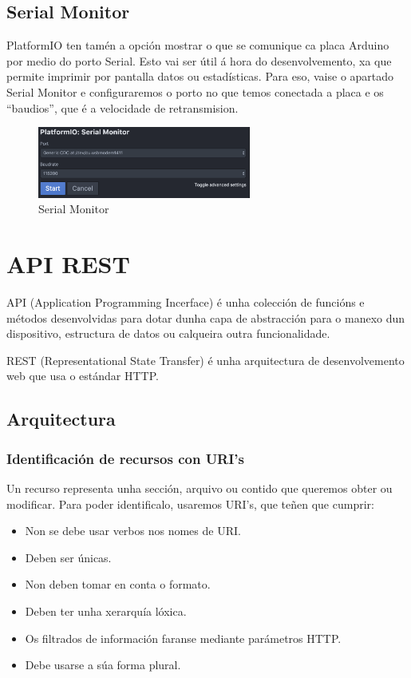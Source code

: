 \documentclass[11pt,twoside]{book}
\begin{document}
\subsection{Serial Monitor}

PlatformIO ten tamén a opción mostrar o que se comunique ca placa Arduino por medio do porto Serial.
Esto vai ser útil á hora do desenvolvemento, xa que permite imprimir por pantalla datos ou estadísticas.
 Para eso, vaise o apartado Serial Monitor e configuraremos o porto no que temos conectada a placa e os ``baudios'', que é a velocidade de retransmision.
 
 \begin{figure}[H]
	\begin{center}
		\includegraphics[width=7cm]{images/serial_monitor.png}
	\end{center}
	\caption{Serial Monitor}
	\label{fig:LibreriasAtom}
\end{figure}

\section{API REST}

API (Application Programming Incerface) é unha colección de funcións e métodos desenvolvidas para dotar dunha capa de abstracción para o manexo dun dispositivo, estructura de datos ou calqueira outra funcionalidade. 

REST (Representational State Transfer) é unha arquitectura de desenvolvemento web que usa o estándar HTTP.

\subsection{Arquitectura}

\subsubsection{Identificación de recursos con URI's}

Un recurso representa unha sección, arquivo ou contido que queremos obter ou modificar. Para poder identificalo, usaremos URI's, que teñen que cumprir:
\begin{itemize}
    \item Non se debe usar verbos nos nomes de URI.
    \item Deben ser únicas.
    \item Non deben tomar en conta o formato.
    \item Deben ter unha xerarquía lóxica.
    \item Os filtrados de información faranse mediante parámetros HTTP.
    \item Debe usarse a súa forma plural.
\end{itemize}
\end{document}
